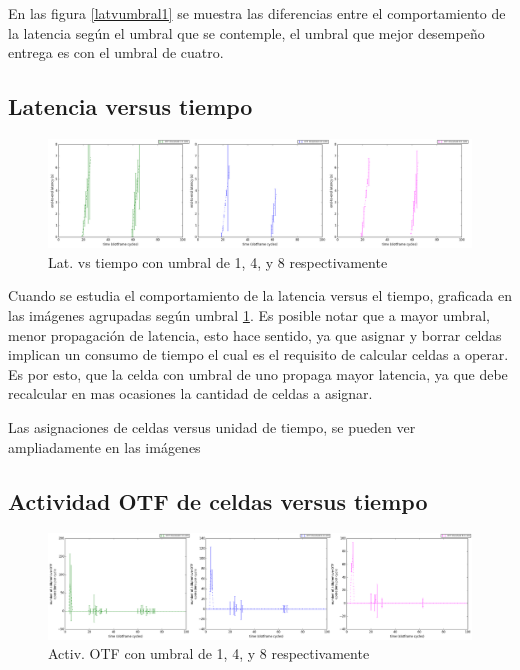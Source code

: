     En las figura \ref{latvumbral1} se muestra las diferencias entre el comportamiento de la latencia según el umbral que se contemple, el umbral que mejor desempeño entrega es con el umbral de cuatro.

\subsection{Latencia versus tiempo}

        \begin{figure}[h]
        \graphicspath{ {imagenes/agrupadas/} }
        \centering
        \includegraphics[width=1.0\textwidth]{latvtime.png}
        \caption{Lat. vs tiempo con umbral de 1, 4, y 8 respectivamente}
        \label{latvtime}
        \end{figure}

    Cuando se estudia el comportamiento de la latencia versus el tiempo, graficada en las imágenes agrupadas según umbral \ref{latvtime}. Es posible notar que a mayor umbral, menor propagación de latencia, esto hace sentido, ya que asignar y borrar celdas implican un consumo de tiempo el cual es el requisito de calcular celdas a operar. Es por esto, que la celda con umbral de uno propaga mayor latencia, ya que debe recalcular en mas ocasiones la cantidad de celdas a asignar.
    
    Las asignaciones de celdas versus unidad de tiempo, se pueden ver ampliadamente en las imágenes
    
\subsection{Actividad OTF de celdas versus tiempo}

        \begin{figure}[h]
        \graphicspath{ {imagenes/agrupadas/} }
        \centering
        \includegraphics[width=1.0\textwidth]{otfactvstime.png}
        \caption{Activ. OTF con umbral de 1, 4, y 8 respectivamente}
        \label{actotfvtime}
        \end{figure}


